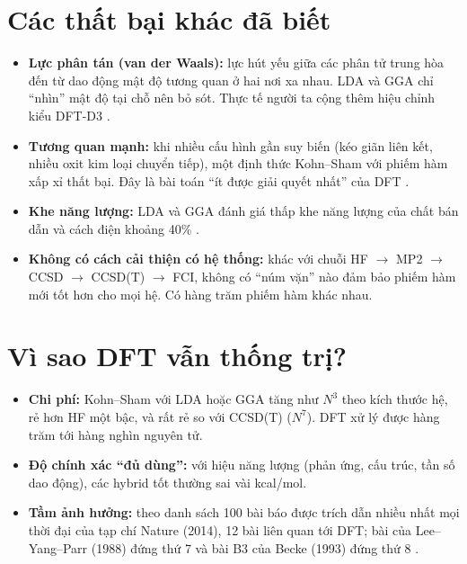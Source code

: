 \section{Các thất bại khác đã biết}
\begin{itemize}
\item \textbf{Lực phân tán (van der Waals):} lực hút yếu giữa các phân tử trung hòa đến từ dao động mật độ tương quan ở hai nơi xa nhau. LDA và GGA chỉ ``nhìn'' mật độ tại chỗ nên bỏ sót. Thực tế người ta cộng thêm hiệu chỉnh kiểu DFT-D3 \cite{Grimme2010}.
\item \textbf{Tương quan mạnh:} khi nhiều cấu hình gần suy biến (kéo giãn liên kết, nhiều oxit kim loại chuyển tiếp), một định thức Kohn--Sham với phiếm hàm xấp xỉ thất bại. Đây là bài toán ``ít được giải quyết nhất'' của DFT \cite{Mardirossian2017}.
\item \textbf{Khe năng lượng:} LDA và GGA đánh giá thấp khe năng lượng của chất bán dẫn và cách điện khoảng 40\% \cite{PerdewLevy1983}.
\item \textbf{Không có cách cải thiện có hệ thống:} khác với chuỗi HF $\to$ MP2 $\to$ CCSD $\to$ CCSD(T) $\to$ FCI, không có ``núm vặn'' nào đảm bảo phiếm hàm mới tốt hơn cho mọi hệ. Có hàng trăm phiếm hàm khác nhau.
\end{itemize}

\section{Vì sao DFT vẫn thống trị?}
\begin{itemize}
\item \textbf{Chi phí:} Kohn--Sham với LDA hoặc GGA tăng như $N^3$ theo kích thước hệ, rẻ hơn HF một bậc, và rất rẻ so với CCSD(T) ($N^7$). DFT xử lý được hàng trăm tới hàng nghìn nguyên tử.
\item \textbf{Độ chính xác ``đủ dùng'':} với hiệu năng lượng (phản ứng, cấu trúc, tần số dao động), các hybrid tốt thường sai vài kcal/mol.
\item \textbf{Tầm ảnh hưởng:} theo danh sách 100 bài báo được trích dẫn nhiều nhất mọi thời đại của tạp chí Nature (2014), 12 bài liên quan tới DFT; bài của Lee--Yang--Parr (1988) đứng thứ 7 và bài B3 của Becke (1993) đứng thứ 8 \cite{VanNoorden2014}.
\end{itemize}


